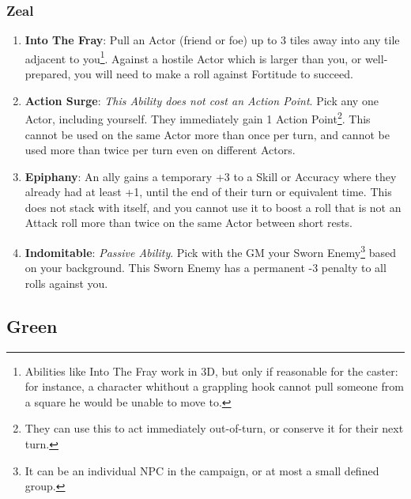 \subsubsection{Zeal}
\begin{enumerate}
    \item \textbf{Into The Fray}: Pull an Actor (friend or foe) up to 3 tiles away into any tile adjacent to you\footnote{Abilities like Into The Fray work in 3D, but only if reasonable for the caster: for instance, a character whithout a grappling hook cannot pull someone from a square he would be unable to move to.}. Against a hostile Actor which is larger than you, or well-prepared, you will need to make a roll against Fortitude to succeed.
    \item \textbf{Action Surge}: \textit{This Ability does not cost an Action Point}. Pick any one Actor, including yourself. They immediately gain 1 Action Point\footnote{They can use this to act immediately out-of-turn, or conserve it for their next turn.}. This cannot be used on the same Actor more than once per turn, and cannot be used more than twice per turn even on different Actors.
    \item \textbf{Epiphany}: An ally gains a temporary +3 to a Skill or Accuracy where they already had at least +1, until the end of their turn or equivalent time. This does not stack with itself, and you cannot use it to boost a roll that is not an Attack roll more than twice on the same Actor between short rests.
    \item \textbf{Indomitable}: \textit{Passive Ability}. Pick with the GM your Sworn Enemy\footnote{It can be an individual NPC in the campaign, or at most a small defined group.} based on your background. This Sworn Enemy has a permanent -3 penalty to all rolls against you.
\end{enumerate}

\subsection{Green}

